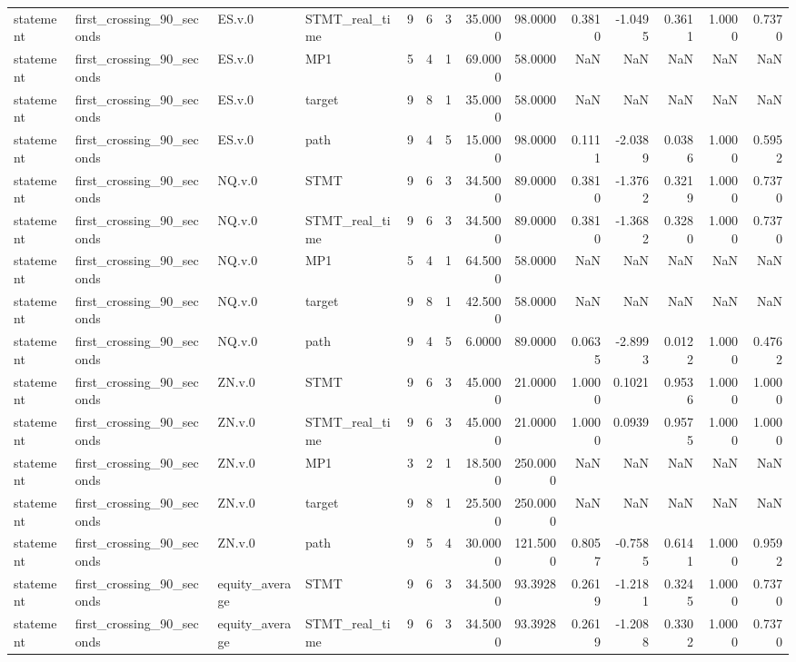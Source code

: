 \begin{tabular}{llllrrrrrrrrrr}
statement & first_crossing_90_seconds & ES.v.0 & STMT_real_time & 9 & 6 & 3 & 35.0000 & 98.0000 & 0.3810 & -1.0495 & 0.3611 & 1.0000 & 0.7370 \\
statement & first_crossing_90_seconds & ES.v.0 & MP1 & 5 & 4 & 1 & 69.0000 & 58.0000 & NaN & NaN & NaN & NaN & NaN \\
statement & first_crossing_90_seconds & ES.v.0 & target & 9 & 8 & 1 & 35.0000 & 58.0000 & NaN & NaN & NaN & NaN & NaN \\
statement & first_crossing_90_seconds & ES.v.0 & path & 9 & 4 & 5 & 15.0000 & 98.0000 & 0.1111 & -2.0389 & 0.0386 & 1.0000 & 0.5952 \\
statement & first_crossing_90_seconds & NQ.v.0 & STMT & 9 & 6 & 3 & 34.5000 & 89.0000 & 0.3810 & -1.3762 & 0.3219 & 1.0000 & 0.7370 \\
statement & first_crossing_90_seconds & NQ.v.0 & STMT_real_time & 9 & 6 & 3 & 34.5000 & 89.0000 & 0.3810 & -1.3682 & 0.3280 & 1.0000 & 0.7370 \\
statement & first_crossing_90_seconds & NQ.v.0 & MP1 & 5 & 4 & 1 & 64.5000 & 58.0000 & NaN & NaN & NaN & NaN & NaN \\
statement & first_crossing_90_seconds & NQ.v.0 & target & 9 & 8 & 1 & 42.5000 & 58.0000 & NaN & NaN & NaN & NaN & NaN \\
statement & first_crossing_90_seconds & NQ.v.0 & path & 9 & 4 & 5 & 6.0000 & 89.0000 & 0.0635 & -2.8993 & 0.0122 & 1.0000 & 0.4762 \\
statement & first_crossing_90_seconds & ZN.v.0 & STMT & 9 & 6 & 3 & 45.0000 & 21.0000 & 1.0000 & 0.1021 & 0.9536 & 1.0000 & 1.0000 \\
statement & first_crossing_90_seconds & ZN.v.0 & STMT_real_time & 9 & 6 & 3 & 45.0000 & 21.0000 & 1.0000 & 0.0939 & 0.9575 & 1.0000 & 1.0000 \\
statement & first_crossing_90_seconds & ZN.v.0 & MP1 & 3 & 2 & 1 & 18.5000 & 250.0000 & NaN & NaN & NaN & NaN & NaN \\
statement & first_crossing_90_seconds & ZN.v.0 & target & 9 & 8 & 1 & 25.5000 & 250.0000 & NaN & NaN & NaN & NaN & NaN \\
statement & first_crossing_90_seconds & ZN.v.0 & path & 9 & 5 & 4 & 30.0000 & 121.5000 & 0.8057 & -0.7585 & 0.6141 & 1.0000 & 0.9592 \\
statement & first_crossing_90_seconds & equity_average & STMT & 9 & 6 & 3 & 34.5000 & 93.3928 & 0.2619 & -1.2181 & 0.3245 & 1.0000 & 0.7370 \\
statement & first_crossing_90_seconds & equity_average & STMT_real_time & 9 & 6 & 3 & 34.5000 & 93.3928 & 0.2619 & -1.2088 & 0.3302 & 1.0000 & 0.7370 \\

\end{tabular}
